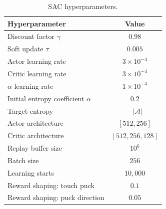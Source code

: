 \documentclass[11pt]{article}
\begin{document}
\begin{table}[htbp]
\centering
\caption{\ac{SAC} hyperparameters.}
\vspace{-0.3cm}
\label{tab:sac_hyperparams}
\begin{tabular}{lc}
\toprule
\textbf{Hyperparameter} & \textbf{Value} \\
\midrule
Discount factor $\gamma$         & $0.98$ \\
Soft update $\tau$               & $0.005$ \\
Actor learning rate              & $3 \times 10^{-4}$ \\
Critic learning rate             & $3 \times 10^{-4}$ \\
$\alpha$ learning rate           & $1 \times 10^{-4}$ \\
Initial entropy coefficient $\alpha$ & $0.2$ \\
Target entropy                   & $-|\mathcal{A}|$ \\
Actor architecture               & $[512, 256]$ \\
Critic architecture              & $[512, 256, 128]$ \\
Replay buffer size               & $10^6$ \\
Batch size                       & $256$ \\
Learning starts                  & $10{,}000$ \\
Reward shaping: touch puck       & $0.1$ \\
Reward shaping: puck direction   & $0.05$ \\
\bottomrule
\end{tabular}
\end{table}

\vspace{+0.6cm}
\end{document}
